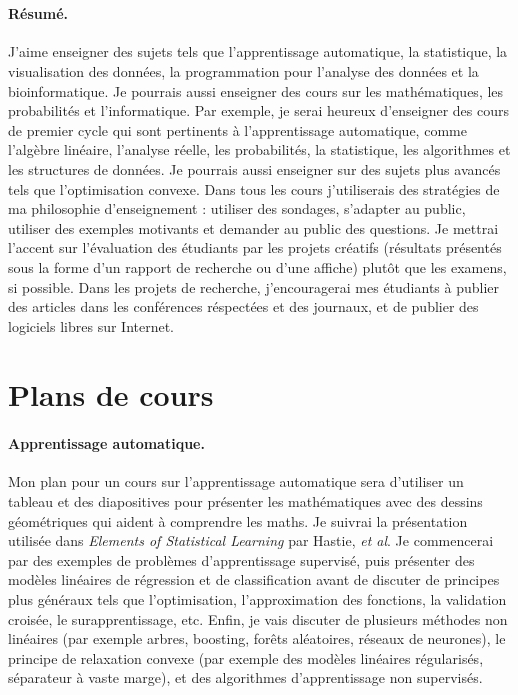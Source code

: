 \documentclass{article}
\begin{document}
 \mbox{ }


\paragraph{Résumé.} J'aime enseigner des sujets tels que
l'apprentissage automatique, la statistique, la visualisation des
données, la programmation pour l'analyse des données et la
bioinformatique. Je pourrais aussi enseigner des cours sur les
mathématiques, les probabilités et l'informatique. Par exemple, je serai
heureux d'enseigner des cours de premier cycle qui sont pertinents à
l'apprentissage automatique, comme l'algèbre linéaire, l'analyse
réelle, les probabilités, la statistique, les algorithmes et les
structures de données. Je pourrais aussi enseigner sur des sujets plus
avancés tels que l'optimisation convexe. Dans tous les cours
j'utiliserais des stratégies de ma philosophie d'enseignement : utiliser des sondages, s'adapter au public, utiliser des exemples motivants
et demander au public des questions. Je mettrai l'accent sur
l'évaluation des étudiants par les projets créatifs (résultats
présentés sous la forme d'un rapport de recherche ou d'une affiche)
plutôt que les examens, si possible. Dans les projets de recherche,
j'encouragerai mes étudiants à publier des articles dans les
conférences réspectées et des journaux, et de publier des logiciels
libres sur Internet.

\section{Plans de cours}

\paragraph{Apprentissage automatique.} 
Mon plan pour un cours sur l'apprentissage automatique sera d'utiliser
un tableau et des diapositives pour présenter les mathématiques avec
des dessins géométriques qui aident à comprendre les maths. Je suivrai
la présentation utilisée dans \emph{Elements of Statistical Learning}
par Hastie, \emph{et al}. Je commencerai par des exemples de
problèmes d'apprentissage supervisé, puis présenter des modèles
linéaires de régression et de classification avant de discuter de
principes plus généraux tels que l'optimisation, l'approximation des
fonctions, la validation croisée, le surapprentissage, etc. Enfin, je
vais discuter de plusieurs méthodes non linéaires (par exemple arbres,
boosting, forêts aléatoires, réseaux de neurones), le principe de
relaxation convexe (par exemple des modèles linéaires régularisés,
séparateur à vaste marge), et des algorithmes d'apprentissage non
supervisés.
\end{document}
